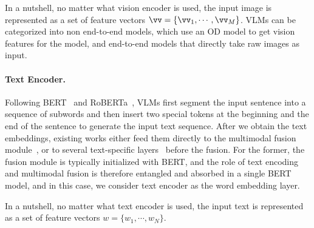 In a nutshell, no matter what vision encoder is used, the input image is represented as a set of feature vectors $\vv=\{ \vv_1, \cdots, \vv_M\}$. VLMs can be categorized into non end-to-end models, which use an OD model to get vision features for the model, and end-to-end models that directly take raw images as input.



\paragraph{Text Encoder.} Following BERT~\citep{devlin-etal-2019-bert} and RoBERTa~\citep{liu2019roberta}, VLMs first segment the input sentence into a sequence of subwords and then insert two special tokens at the beginning and the end of the sentence to generate the input text sequence. After we obtain the text embeddings, existing works either feed them directly to the multimodal fusion module~\citep{li2019visualbert,chen2020uniter}, or to several text-specific layers~\citep{tan-bansal-2019-lxmert,lu2019vilbert} before the fusion. For the former, the fusion module is typically initialized with BERT, and the role of text encoding and multimodal fusion is therefore entangled and absorbed in a single BERT model, and in this case, we consider text encoder as the word embedding layer. 

In a nutshell, no matter what text encoder is used, the input text is represented as a set of feature vectors $w=\{ w_1, \cdots, w_N\}$.

